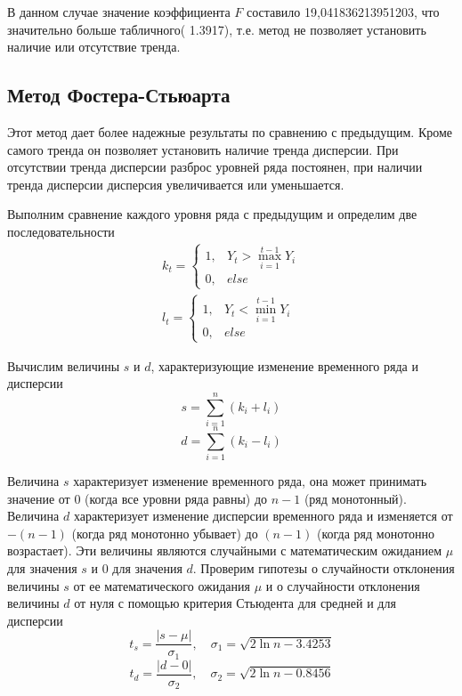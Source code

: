 \documentclass[a4paper,12pt]{article}
\begin{document}
\vspace{0.5cm}
В данном случае значение коэффициента $F$ составило 19,041836213951203, что значительно больше табличного( 1.3917), т.е. метод не позволяет установить наличие или отсутствие тренда.
\vfill

\newpage
\subsection{Метод Фостера-Стьюарта}
Этот метод дает более надежные результаты по сравнению с предыдущим. Кроме самого тренда он позволяет установить наличие тренда дисперсии. При отсутствии тренда дисперсии разброс уровней ряда постоянен, при наличии тренда дисперсии дисперсия увеличивается или уменьшается.

\vspace{0.5cm}
Выполним сравнение каждого уровня ряда с предыдущим и определим две последовательности
$$\begin{array}{c}
	k_t = \left\{\begin{array}{ll}
		1, & Y_t > \max\limits_{i=1}^{t-1}Y_i\\
		0, & else
	\end{array}\right.\\
	l_t = \left\{\begin{array}{ll}
		1, & Y_t < \min\limits_{i=1}^{t-1}Y_i\\
		0, & else
	\end{array}\right.
\end{array}$$

\vspace{0.5cm}
Вычислим величины $s$ и $d$, характеризующие изменение временного ряда и дисперсии
$$s = \sum\limits_{i=1}^n (k_i + l_i)$$
$$d = \sum\limits_{i=1}^n (k_i - l_i)$$
 
Величина $s$ характеризует изменение временного ряда, она может принимать значение от $0$ (когда все уровни ряда равны) до $n - 1$ (ряд монотонный). Величина $d$ характеризует изменение дисперсии временного ряда и изменяется от $-(n - 1)$ (когда ряд монотонно убывает) до $(n - 1)$ (когда ряд монотонно возрастает). Эти величины являются случайными с математическим ожиданием $\mu$ для значения $s$ и $0$ для значения $d$.
Проверим гипотезы о случайности отклонения величины $s$ от ее математического ожидания $\mu$ и о случайности отклонения величины $d$ от нуля с помощью критерия Стьюдента для средней и для дисперсии
$$t_s = \frac{|s - \mu|}{\sigma_1}, \quad \sigma_1 = \sqrt{2\ln n - 3.4253}$$
$$t_d = \frac{|d - 0|}{\sigma_2}, \quad \sigma_2 = \sqrt{2\ln n - 0.8456}$$
 
\end{document}
